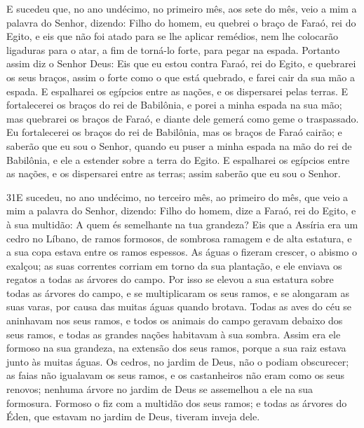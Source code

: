 E sucedeu que, no ano undécimo, no primeiro mês, aos sete do mês,
veio a mim a palavra do Senhor, dizendo: Filho do homem, eu
quebrei o braço de Faraó, rei do Egito, e eis que não foi atado para
se lhe aplicar remédios, nem lhe colocarão ligaduras para o atar, a
fim de torná-lo forte, para pegar na espada. Portanto assim
diz o Senhor Deus: Eis que eu estou contra Faraó, rei do Egito, e
quebrarei os seus braços, assim o forte como o que está quebrado, e
farei cair da sua mão a espada. E espalharei os egípcios
entre as nações, e os dispersarei pelas terras. E
fortalecerei os braços do rei de Babilônia, e porei a minha espada
na sua mão; mas quebrarei os braços de Faraó, e diante dele gemerá
como geme o traspassado. Eu fortalecerei os braços do rei de
Babilônia, mas os braços de Faraó cairão; e saberão que eu sou o
Senhor, quando eu puser a minha espada na mão do rei de Babilônia, e
ele a estender sobre a terra do Egito. E espalharei os
egípcios entre as nações, e os dispersarei entre as terras; assim
saberão que eu sou o Senhor.

\medskip

\lettrine{31} E sucedeu, no ano undécimo, no terceiro mês, ao
primeiro do mês, que veio a mim a palavra do Senhor, dizendo:
Filho do homem, dize a Faraó, rei do Egito, e à sua multidão: A
quem és semelhante na tua grandeza? Eis que a Assíria era um
cedro no Líbano, de ramos formosos, de sombrosa ramagem e de alta
estatura, e a sua copa estava entre os ramos espessos. As águas
o fizeram crescer, o abismo o exalçou; as suas correntes corriam em
torno da sua plantação, e ele enviava os regatos a todas as árvores
do campo. Por isso se elevou a sua estatura sobre todas as
árvores do campo, e se multiplicaram os seus ramos, e se alongaram
as suas varas, por causa das muitas águas quando brotava. Todas
as aves do céu se aninhavam nos seus ramos, e todos os animais do
campo geravam debaixo dos seus ramos, e todas as grandes nações
habitavam à sua sombra. Assim era ele formoso na sua grandeza,
na extensão dos seus ramos, porque a sua raiz estava junto às muitas
águas. Os cedros, no jardim de Deus, não o podiam obscurecer; as
faias não igualavam os seus ramos, e os castanheiros não eram como
os seus renovos; nenhuma árvore no jardim de Deus se assemelhou a
ele na sua formosura. Formoso o fiz com a multidão dos seus
ramos; e todas as árvores do Éden, que estavam no jardim de Deus,
tiveram inveja dele.

